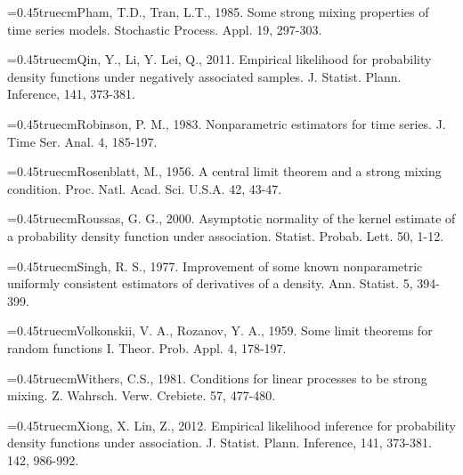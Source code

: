 \documentclass[12pt]{article}
\def\nh{\noindent\hangindent=0.45truecm\hangafter=1}
\begin{document}

\nh Pham, T.D., Tran, L.T., 1985. Some strong mixing properties of time series models. Stochastic Process. Appl. 19,  297-303.

\nh Qin, Y., Li, Y.  Lei, Q., 2011. Empirical likelihood for probability density functions
under negatively associated samples. J. Statist. Plann. Inference, 141, 373-381.

\nh Robinson, P. M., 1983. Nonparametric estimators for time series. J. Time Ser. Anal. 4, 185-197.

\nh Rosenblatt, M., 1956. A central limit theorem and a strong mixing condition. Proc. Natl.  Acad.
Sci. U.S.A. 42,  43-47.

\nh  Roussas, G. G., 2000. Asymptotic normality of the
kernel estimate of a probability density function under association.
Statist. Probab. Lett. 50, 1-12.



\nh  Singh, R. S., 1977. Improvement of some known nonparametric uniformly consistent estimators of
derivatives of a density.  Ann. Statist.  5, 394-399.

\nh Volkonskii, V. A., Rozanov, Y. A., 1959.  Some limit theorems for random functions I.  Theor. Prob.
Appl. 4, 178-197.

\nh Withers, C.S., 1981. Conditions for linear processes to be strong mixing. Z. Wahrsch. Verw. Crebiete. 57, 477-480.

\nh Xiong, X. Lin, Z., 2012. Empirical likelihood inference for probability density functions
under association. J. Statist. Plann. Inference, 141, 373-381. 142, 986-992.

\end{document}
